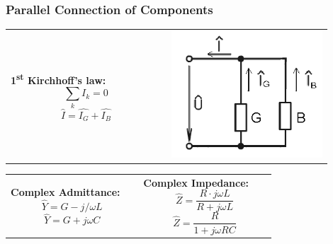 \documentclass{beamer}
\begin{document}
	\begin{frame}
    \frametitle{Parallel Connection of Components}
		\begin{center}
		\begin{tabular}{m{0.45\linewidth} m{0.45\linewidth}}
			\textbf{1\textsuperscript{st} Kirchhoff's law:} $$\sum_k I_k = 0$$ $$\hat{I}= \hat{I_G} + \hat{I_B}$$& \includegraphics[scale=0.4]{obr13_obvodParalelni.png}
		\end{tabular}
		\begin{tabular}{p{0.45\linewidth} p{0.45\linewidth}}
			\textbf{Complex Admittance:} $$\hat{Y} = G - j/\omega L$$ $$\hat{Y} = G + j\omega C$$& \textbf{Complex Impedance:} $$\hat{Z} = \frac{R\cdot j\omega L}{R+j\omega L}$$ $$\hat{Z} = \frac{R}{1+j\omega RC} $$
		\end{tabular}
		\end{center}
  \end{frame}
\end{document}

